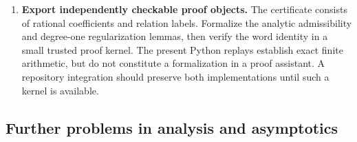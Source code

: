 \documentclass[11pt]{article}
\numberwithin{equation}{section}
\theoremstyle{plain}
\theoremstyle{definition}
\theoremstyle{remark}
\begin{document}
\begin{enumerate}[leftmargin=*,itemsep=5pt]
\item \textbf{Export independently checkable proof objects.}
The certificate consists of rational coefficients and relation labels.
Formalize the analytic admissibility and degree-one regularization
lemmas, then verify the word identity in a small trusted proof kernel.
The present Python replays establish exact finite arithmetic, but do not
constitute a formalization in a proof assistant. A repository integration
should preserve both implementations until such a kernel is available.
\end{enumerate}

\subsection{Further problems in analysis and asymptotics}
\end{document}

